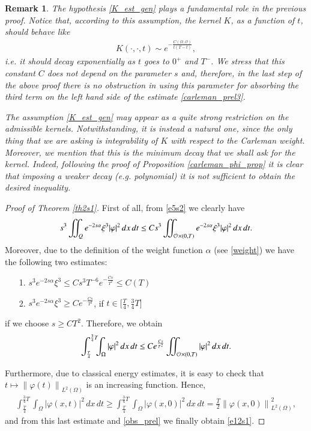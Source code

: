 \documentclass[preprint,1p]{elsarticle}
\newcommand{\norm}[2]{\left\|#1\right\|_{#2}}
\newcommand{\intd}{\displaystyle\int \kern -7pt \int}
\newtheorem{remark}{\bf Remark}[section]
\begin{document}
%
\begin{remark}\label{rem_lambda}
The hypothesis \eqref{K_est_gen} plays a fundamental role in the previous proof. Notice that, according to this assumption, the kernel $K$, as a function of $t$, should behave like 
\begin{align*}
	K(\cdot,\cdot,t)\sim e^{-\frac{C(\Omega,\mathcal O)}{t(T-t)}},
\end{align*}
i.e. it should decay exponentially as $t$ goes to $0^+$ and $T^-$. We stress that this constant $C$ does not depend on the parameter $s$ and, therefore, in the last step of the above proof there is no obstruction in using this parameter for absorbing the third term on the left hand side of the estimate \eqref{carleman_prel3}.
	
The assumption \eqref{K_est_gen} may appear as a quite strong restriction on the admissible kernels. Notwithstanding, it is instead a natural one, since the only thing that we are asking is integrability of $K$ with respect to the Carleman weight. Moreover, we mention that this is the minimum decay that we shall ask for the kernel. Indeed, following the proof of Proposition \ref{carleman_phi_prop} it is clear that imposing a weaker decay (e.g. polynomial) it is not sufficient to obtain the desired inequality.
\end{remark}
%
\begin{proof}[Proof of Theorem \ref{th2s1}]

First of all, from \eqref{e5s2} we clearly have
\begin{align*}
	s^3\intd_Q e^{-2s\alpha}\xi^3|\varphi|^2\,dx\,dt \leq C s^3\intd_{\mathcal O\times(0,T)} e^{-2s\alpha}\xi^3 |\varphi|^2\,dx\,dt.
\end{align*}
Moreover, due to the definition of the weight function $\alpha$ (see \eqref{weight}) we have the following two estimates:
\begin{enumerate}
	\item[1.] $s^3 e^{-2s\alpha}\xi^3 \leq Cs^3T^{-6}e^{-\frac{Cs}{T^2}}\leq C(T)$
	
	\item [2.] $s^3 e^{-2s\alpha}\xi^3 \geq Ce^{-\frac{Cs}{T^2}}$, if $t\in\Big[\frac T4,\frac 34 T\Big]$
\end{enumerate}
if we choose $s\geq CT^2$. Therefore, we obtain
\begin{align}\label{obs_prel}
	\int_{\frac T4}^{\frac 34 T}\!\!\!\int_\Omega |\varphi|^2\,dx\,dt \leq C e^{\frac {Cs}{T^2}}\intd_{\mathcal O\times(0,T)} |\varphi|^2\,dx\,dt.
\end{align}

Furthermore, due to classical energy estimates, it is easy to check that $t\mapsto \norm{\varphi(t)}{L^2(\Omega)}$ is an increasing function. Hence,
\begin{align*}
	\int_{\frac T4}^{\frac 34 T}\!\!\!\int_\Omega |\varphi(x,t)|^2\,dx\,dt \geq \int_{\frac T4}^{\frac 34 T}\!\!\!\int_\Omega |\varphi(x,0)|^2\,dx\,dt = \frac T2 \norm{\varphi(x,0)}{L^2(\Omega)}^2,
\end{align*}
and from this last estimate and \eqref{obs_prel} we finally obtain \eqref{e12s1}.
\end{proof}
\end{document}
